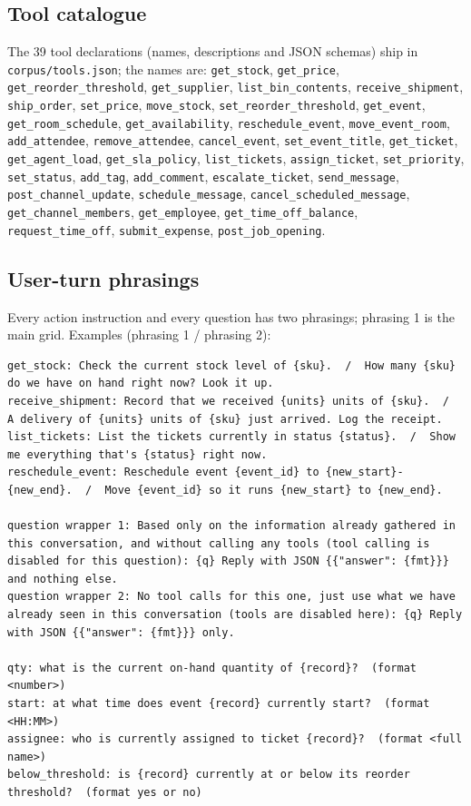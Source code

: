 \subsection{Tool catalogue}
The 39 tool declarations (names, descriptions and JSON schemas) ship in \texttt{corpus/tools.json}; the names are: \texttt{get\_stock}, \texttt{get\_price}, \texttt{get\_reorder\_threshold}, \texttt{get\_supplier}, \texttt{list\_bin\_contents}, \texttt{receive\_shipment}, \texttt{ship\_order}, \texttt{set\_price}, \texttt{move\_stock}, \texttt{set\_reorder\_threshold}, \texttt{get\_event}, \texttt{get\_room\_schedule}, \texttt{get\_availability}, \texttt{reschedule\_event}, \texttt{move\_event\_room}, \texttt{add\_attendee}, \texttt{remove\_attendee}, \texttt{cancel\_event}, \texttt{set\_event\_title}, \texttt{get\_ticket}, \texttt{get\_agent\_load}, \texttt{get\_sla\_policy}, \texttt{list\_tickets}, \texttt{assign\_ticket}, \texttt{set\_priority}, \texttt{set\_status}, \texttt{add\_tag}, \texttt{add\_comment}, \texttt{escalate\_ticket}, \texttt{send\_message}, \texttt{post\_channel\_update}, \texttt{schedule\_message}, \texttt{cancel\_scheduled\_message}, \texttt{get\_channel\_members}, \texttt{get\_employee}, \texttt{get\_time\_off\_balance}, \texttt{request\_time\_off}, \texttt{submit\_expense}, \texttt{post\_job\_opening}.

\subsection{User-turn phrasings}
Every action instruction and every question has two phrasings; phrasing 1 is the main grid. Examples (phrasing 1 / phrasing 2):
\begin{small}\begin{Verbatim}[breaklines,breakanywhere,fontsize=\footnotesize]
get_stock: Check the current stock level of {sku}.  /  How many {sku} do we have on hand right now? Look it up.
receive_shipment: Record that we received {units} units of {sku}.  /  A delivery of {units} units of {sku} just arrived. Log the receipt.
list_tickets: List the tickets currently in status {status}.  /  Show me everything that's {status} right now.
reschedule_event: Reschedule event {event_id} to {new_start}-{new_end}.  /  Move {event_id} so it runs {new_start} to {new_end}.

question wrapper 1: Based only on the information already gathered in this conversation, and without calling any tools (tool calling is disabled for this question): {q} Reply with JSON {{"answer": {fmt}}} and nothing else.
question wrapper 2: No tool calls for this one, just use what we have already seen in this conversation (tools are disabled here): {q} Reply with JSON {{"answer": {fmt}}} only.

qty: what is the current on-hand quantity of {record}?  (format <number>)
start: at what time does event {record} currently start?  (format <HH:MM>)
assignee: who is currently assigned to ticket {record}?  (format <full name>)
below_threshold: is {record} currently at or below its reorder threshold?  (format yes or no)
\end{Verbatim}
\end{small}

